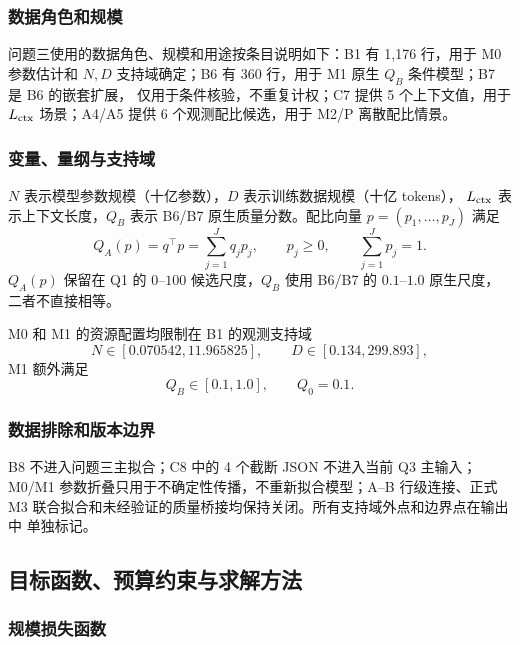 \subsubsection{数据角色和规模}

问题三使用的数据角色、规模和用途按条目说明如下：B1 有 1,176 行，用于 M0 参数估计和
$N,D$ 支持域确定；B6 有 360 行，用于 M1 原生 $Q_B$ 条件模型；B7 是 B6 的嵌套扩展，
仅用于条件核验，不重复计权；C7 提供 5 个上下文值，用于 $L_{\rm ctx}$ 场景；A4/A5
提供 6 个观测配比候选，用于 M2/P 离散配比情景。

\subsubsection{变量、量纲与支持域}

$N$ 表示模型参数规模（十亿参数），$D$ 表示训练数据规模（十亿 tokens），
$L_{\rm ctx}$ 表示上下文长度，$Q_B$ 表示 B6/B7 原生质量分数。配比向量
$p=(p_1,\ldots,p_J)$ 满足
\begin{equation}
 Q_A(p)=q^\top p=\sum_{j=1}^{J}q_jp_j,
 \qquad p_j\ge0,\qquad \sum_{j=1}^{J}p_j=1.
 \label{eq:q3-overview-qa}
\end{equation}
$Q_A(p)$ 保留在 Q1 的 $0$--$100$ 候选尺度，$Q_B$ 使用 B6/B7 的
$0.1$--$1.0$ 原生尺度，二者不直接相等。

M0 和 M1 的资源配置均限制在 B1 的观测支持域
\begin{equation}
 N\in[0.070542,11.965825],\qquad
 D\in[0.134,299.893],
 \label{eq:q3-overview-support}
\end{equation}
M1 额外满足
\begin{equation}
 Q_B\in[0.1,1.0],\qquad Q_0=0.1.
 \label{eq:q3-overview-q-domain}
\end{equation}

\subsubsection{数据排除和版本边界}

B8 不进入问题三主拟合；C8 中的 4 个截断 JSON 不进入当前 Q3 主输入；
M0/M1 参数折叠只用于不确定性传播，不重新拟合模型；A--B 行级连接、正式
M3 联合拟合和未经验证的质量桥接均保持关闭。所有支持域外点和边界点在输出中
单独标记。

\subsection{目标函数、预算约束与求解方法}
\label{sec:q3-objective}

\subsubsection{规模损失函数}

